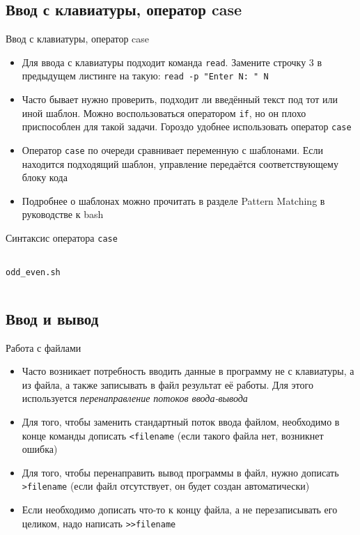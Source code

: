 \documentclass{beamer}
\begin{document}
\subsection{Ввод с клавиатуры, оператор case}
\begin{frame}{Ввод с клавиатуры, оператор case}
	\begin{itemize}
		\item{Для ввода с клавиатуры подходит команда \texttt{read}. Замените строчку 3 в предыдущем листинге на такую: \texttt{read~-p~"Enter~N: "{} N}}\pause
		\item{Часто бывает нужно проверить, подходит ли введённый текст под тот или иной шаблон. Можно воспользоваться оператором \texttt{if}, но он плохо приспособлен для такой задачи. Гороздо удобнее использовать оператор \texttt{case}}\pause
		\item{Оператор \texttt{case} по очереди сравнивает переменную с шаблонами. Если находится подходящий шаблон, управление передаётся соответствующему блоку кода}\pause
		\item{Подробнее о шаблонах можно прочитать в разделе Pattern Matching в руководстве к bash}
	\end{itemize}
\end{frame}

\begin{frame}
	\begin{minipage}{0,325\textwidth}
		Синтаксис оператора \texttt{case}
		\inputminted[linenos,fontsize=\tiny,bgcolor=listing]{bash}{files/01/case.sh}
	\end{minipage}
	\begin{minipage}{0,125\textwidth}
	\end{minipage}
	\begin{minipage}{0,525\textwidth}
		\texttt{odd\_even.sh}
		\inputminted[linenos,fontsize=\tiny,bgcolor=listing]{bash}{files/01/odd_even.sh}
	\end{minipage}
\end{frame}

\subsection{Ввод и вывод}
\begin{frame}{Работа с файлами}
	\begin{itemize}
		\item{Часто возникает потребность вводить данные в программу не с клавиатуры, а из файла, а также записывать в файл результат её работы. Для этого используется \emph{перенаправление потоков ввода-вывода}}\pause
		\item{Для того, чтобы заменить стандартный поток ввода файлом, необходимо в конце команды дописать \texttt{<filename} (если такого файла нет, возникнет ошибка)}\pause
		\item{Для того, чтобы перенаправить вывод программы в файл, нужно дописать \texttt{>filename} (если файл отсутствует, он будет создан автоматически)}\pause
		\item{Если необходимо дописать что-то к концу файла, а не перезаписывать его целиком, надо написать \texttt{>{}>filename}}
	\end{itemize}
\end{frame}
\end{document}
